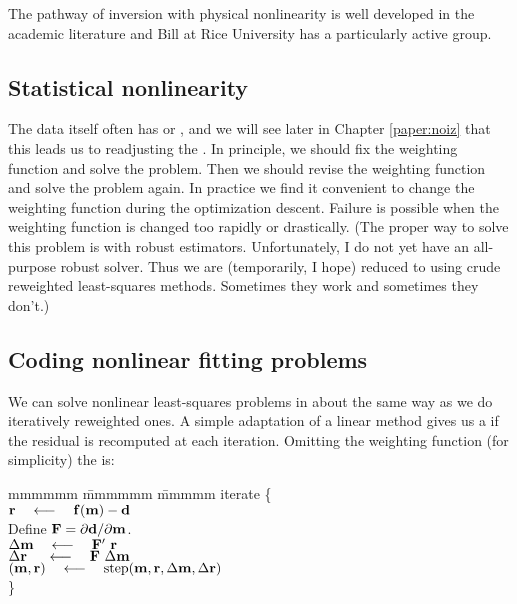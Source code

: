 \par
The pathway of inversion with physical nonlinearity
is well developed in the academic literature
and Bill  at Rice University has a particularly active group.

\subsection{Statistical nonlinearity}
The data itself often has  or , and we will
see later in Chapter \ref{paper:noiz} that this leads us to
readjusting the .  In principle, we should fix
the weighting function and solve the problem.  Then we should revise
the weighting function and solve the problem again.  In practice we
find it convenient to change the weighting function during the
optimization descent.  Failure is possible when the weighting function
is changed too rapidly or drastically.  (The proper way to solve this
problem is with robust estimators.  Unfortunately, I do not yet have
an all-purpose robust solver.  Thus we are (temporarily, I hope)
reduced to using crude reweighted least-squares methods.  Sometimes
they work and sometimes they don't.)

\subsection{Coding nonlinear fitting problems}
We can solve nonlinear least-squares problems
in about the same way as we do iteratively reweighted ones.
A simple adaptation of a linear method gives us a  if
the residual is recomputed at each iteration.
Omitting the weighting function (for simplicity) the  is:
\begin{tabbing}
mmmmmm \= mmmmmm \= mmmmm \kill
\> {\rm iterate \{ }                                                    \\
\>      \> $\bold r \quad\longleftarrow\quad \bold f( \bold m) - \bold d$       \\
\>      \> Define $\bold F=\partial \bold d/\partial \bold m$.       \\
\>      \>  $\Delta\bold m  \quad\longleftarrow\quad \bold F'\         \bold r$ \\
\>      \>  $\Delta\bold r\ \quad\longleftarrow\quad \bold F \ \Delta \bold m$  \\
\>      \>  $(\bold m,\bold r) \quad\longleftarrow\quad {\rm step}
             (\bold m,\bold r, \Delta\bold m,\Delta\bold r )$ \\
\>      \> \}
\end{tabbing}

